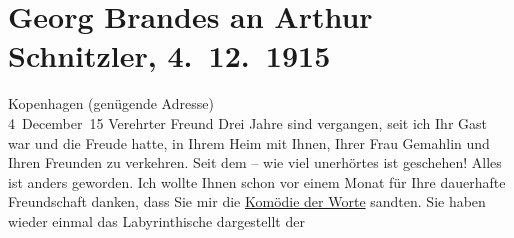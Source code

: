 

         
         \newcommand{\erwaehntePersonen}{Personen: Johann Wolfgang von Goethe, Peter Nansen, Olga Schnitzler}
         \newcommand{\erwaehnteInstitutionen}{}
         \newcommand{\erwaehnteOrte}{Orte: Dänemark, Kopenhagen, Wien}
         \newcommand{\erwaehnteWerke}{Werke: Die Brüder Menthe, Komödie der Worte. Drei Einakter, Macbeth, Professor Bernhardi. Komödie in fünf Akten, Wolfgang Goethe}
               \section[Georg Brandes an Arthur Schnitzler, 4. 12. 1915]{ Georg Brandes an Arthur Schnitzler, 4. 12. 1915}\nopagebreak{}\rehead{ }\begin{ledgroupsized}[t]{13cm}\normalsize\beginnumbering \toendnotes[C]{\smallbreak\pagebreak[2]} 
\toendnotes[C]{\smallbreak}\pstart
           \raggedleft{}{\pb}Kopenhagen (genügende Adresse){\\}4 December 15\pend
           \pstart{}Verehrter Freund\pend\pstart
           Drei Jahre sind vergangen, seit ich Ihr Gast war und die Freude hatte, in Ihrem
                    Heim mit Ihnen, Ihrer Frau Gemahlin und Ihren Freunden zu verkehren. Seit dem – wie viel
                    unerhörtes ist geschehen! Alles ist anders geworden.\pend
           \pstart
           Ich wollte Ihnen schon vor einem Monat für Ihre dauerhafte Freundschaft danken,
                    dass Sie mir die \uline{Komödie der Worte}
               sandten. Sie haben wieder einmal das Labyrinthische dargestellt der

\end{ledgroupsized}
